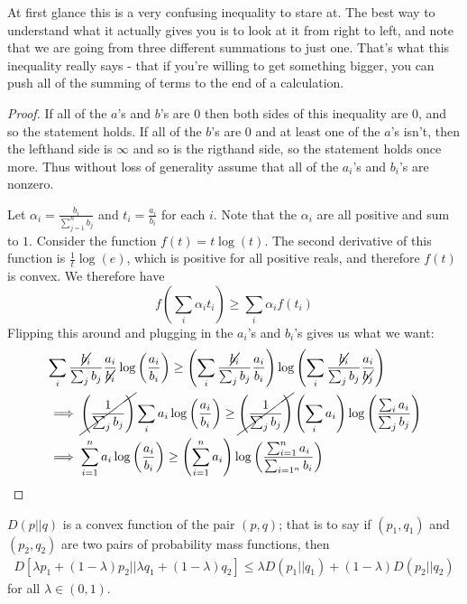 At first glance this is a very confusing inequality to stare at. The best way to understand what it actually gives you is to look at it from right to left, and note that we are going from three different summations to just one. That's what this inequality really says - that if you're willing to get something bigger, you can push all of the summing of terms to the end of a calculation.
\begin{proof}
	If all of the $a$'s and $b$'s are $0$ then both sides of this inequality are $0$, and so the statement holds. If all of the $b$'s are $0$ and at least one of the $a$'s isn't, then the lefthand side is $\infty$ and so is the rigthand side, so the statement holds once more. Thus without loss of generality assume that all of the $a_i$'s and $b_i$'s are nonzero. \par 
	Let $\alpha_i = \frac{b_i}{\sum_{j=1}^n b_j}$ and $t_i = \frac{a_i}{b_i}$ for each $i$. Note that the $\alpha_i$ are all positive and sum to $1$. Consider the function $f(t) = t\log(t)$. The second derivative of this function is $\frac{1}{t}\log(e)$, which is positive for all positive reals, and therefore $f(t)$ is convex. We therefore have 
	\[ f\left(\sum_i \alpha_i t_i \right) \geq \sum_i \alpha_i f(t_i) \]
Flipping this around and plugging in the $a_i$'s and $b_i$'s gives us what we want:
\begin{align}
	& \sum_i \frac{\cancel{b_i}}{\sum_j b_j} \frac{a_i}{\cancel{b_i}} \log\left( \frac{a_i}{b_i} \right) \geq \left( \sum_i \frac{\cancel{b_i}}{\sum_j b_j} \frac{a_i}{b_i} \right)\log\left( \sum_i \frac{\cancel{b_i}}{\sum_j b_j} \frac{a_i}{\cancel{b_j}} \right) \\
	&\implies \cancel{\left(\frac{1}{\sum_j b_j} \right)}\sum_i a_i\log\left(\frac{a_i}{b_i}\right) \geq  \cancel{\left(\frac{1}{\sum_j b_j} \right)}\left(\sum_i a_i \right)\log\left(\frac{\sum_i a_i}{\sum_j b_j}\right) \\
	&\implies \sum_{i=1}^n a_i\log\left(\frac{a_i}{b_i}\right) \geq \left(\sum_{i=1}^n a_i\right)\log\left(\frac{\sum_{i=1}^n a_i}{\sum_{i=1^n}b_i}\right)
\end{align}
\end{proof}	
\begin{theorem}
	$D(p||q)$ is a convex function of the pair $(p,q)$; that is to say if $(p_1,q_1)$ and $(p_2,q_2)$ are two pairs of probability mass functions, then 
\begin{align}
	D[\lambda p_1 + (1-\lambda)p_2 || \lambda q_1 + (1-\lambda)q_2] \leq \lambda D(p_1||q_1) + (1-\lambda)D(p_2||q_2)
\end{align}
for all $\lambda \in (0,1)$. 
\end{theorem}

